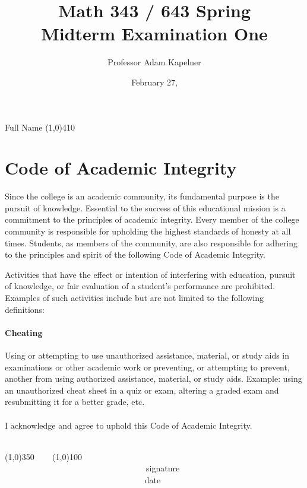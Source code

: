 \documentclass[12pt]{article}
\title{Math 343 / 643 Spring \the\year{} \\ Midterm Examination One}
\author{Professor Adam Kapelner}
\date{February 27, \the\year{}}
\begin{document}
\maketitle

\noindent Full Name \line(1,0){410}

\thispagestyle{empty}

\section*{Code of Academic Integrity}

\footnotesize
Since the college is an academic community, its fundamental purpose is the pursuit of knowledge. Essential to the success of this educational mission is a commitment to the principles of academic integrity. Every member of the college community is responsible for upholding the highest standards of honesty at all times. Students, as members of the community, are also responsible for adhering to the principles and spirit of the following Code of Academic Integrity.

Activities that have the effect or intention of interfering with education, pursuit of knowledge, or fair evaluation of a student's performance are prohibited. Examples of such activities include but are not limited to the following definitions:

\paragraph{Cheating} Using or attempting to use unauthorized assistance, material, or study aids in examinations or other academic work or preventing, or attempting to prevent, another from using authorized assistance, material, or study aids. Example: using an unauthorized cheat sheet in a quiz or exam, altering a graded exam and resubmitting it for a better grade, etc.\\
\\
\noindent I acknowledge and agree to uphold this Code of Academic Integrity. \\~\\

\begin{center}
\line(1,0){350} ~~~ \line(1,0){100}\\
~~~~~~~~~~~~~~~~~~~~~~~~~~~~~~~~~~signature~~~~~~~~~~~~~~~~~~~~~~~~~~~~~~~~~~~~~~~~~~~~~~~~~~~~~~~~~~~~~~ date
\end{center}

\normalsize
\end{document}
